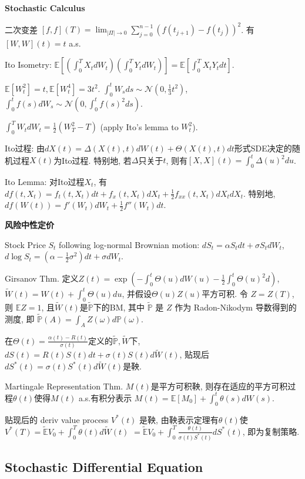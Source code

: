 \documentclass[UTF8]{ctexart}
\begin{document}
\noindent \textbf{Stochastic Calculus}

二次变差 $[f,f](T)=\lim_{|\Pi|\to 0} \sum_{j=0}^{n-1}(f(t_{j+1})-f(t_j))^2$. 有 $[W,W](t)=t$ a.s.

Ito Isometry: $\mathbb{E}\left[ (\int_0^T X_t dW_t)(\int_0^T Y_t dW_t) \right]
	=\mathbb{E}\left[ \int_0^T X_t Y_t dt \right]$.

$\mathbb{E}[W_t^2]=t, \mathbb{E}[W_t^4]=3t^2$.
$\int_0^t W_s ds \sim \mathcal{N}(0,\frac13 t^2)$,
$\int_0^t f(s) dW_s \sim \mathcal{N}\left(0,\int_0^t f(s)^2 ds\right)$.

$\int_0^T W_tdW_t = \frac12 (W_T^2-T)$ (apply Ito's lemma to $W_t^2$).

Ito过程: 由$dX(t)=\Delta(X(t),t)dW(t)+\Theta(X(t),t)dt$形式SDE决定的随机过程$X(t)$为Ito过程.
特别地, 若$\Delta$只关于$t$, 则有$[X,X](t)=\int_0^t \Delta(u)^2 du$.

Ito Lemma: 对Ito过程$X_t$, 有
$df(t,X_t) = f_t(t,X_t)dt + f_x(t,X_t)dX_t+\frac{1}{2}f_{xx}(t,X_t)dX_tdX_t$.
特别地, $df(W(t)) = f'(W_t)dW_t + \frac{1}{2}f''(W_t)dt$.

\noindent \textbf{风险中性定价}

Stock Price $S_t$ following log-normal Brownian motion:
$dS_t = \alpha S_t dt + \sigma S_t dW_t$,
$d \log S_t = (\alpha -\frac{1}{2}\sigma^2)dt+\sigma dW_t$.

Girsanov Thm.
定义$Z(t)=\exp\left(-\int_0^t \Theta(u)dW(u)-\frac12 \int_0^t \Theta(u)^2 d\right)$,
$\widetilde{W}(t)=W(t)+\int_0^t\Theta(u)du$,
并假设$\Theta(u)Z(u)$平方可积.
令 $Z=Z(T)$, 则 $\mathbb{E}Z=1$,
且$\widetilde{W}(t)$是$\widetilde{\mathbb{P}}$下的BM, 其中
$\widetilde{\mathbb{P}}$ 是 $Z$ 作为 Radon-Nikodym 导数得到的测度,
即 $\widetilde{\mathbb{P}}(A)=\int_A Z(\omega)d\mathbb{P}(\omega)$.

在$\Theta(t)=\frac{\alpha(t)-R(t)}{\sigma(t)}$定义的$\widetilde{\mathbb{P}},\widetilde{W}$下,
$dS(t)=R(t)S(t)dt+\sigma(t)S(t)d\widetilde{W}(t)$, 贴现后
$dS^*(t)=\sigma(t) S^*(t) d\widetilde{W}(t)$是鞅.

Martingale Representation Thm.
$M(t)$是平方可积鞅, 则存在适应的平方可积过程$\theta(t)$使得$M(t)$ a.s.有积分表示
$M(t)=\mathbb{E}[M_0]+\int_0^t \theta(s) dW(s)$.

贴现后的 deriv value process $V^*(t)$ 是鞅, 由鞅表示定理有$\theta(t)$使
$V^*(T)=\widetilde{\mathbb{E}}V_0 + \int_0^T \theta(t) d\widetilde{W}(t)$
$=\widetilde{\mathbb{E}}V_0 + \int_0^T \frac{\theta(t)}{\sigma(t)S^*(t)} dS^*(t)$,
即为复制策略.

\subsection{Stochastic Differential Equation}
\end{document}
